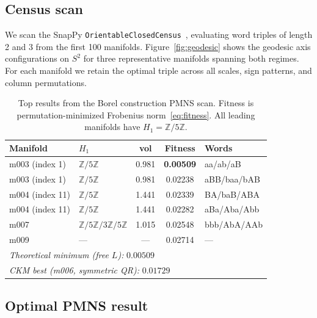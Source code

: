 \documentclass[11pt,a4paper]{article}
\newcommand{\Zfive}{\mathbb{Z}/5\mathbb{Z}}
\begin{document}
\subsection{Census scan}

We scan the SnapPy \texttt{OrientableClosedCensus}~\cite{snappy},
evaluating word triples of length 2 and 3 from the first 100 manifolds. 
Figure~\ref{fig:geodesic} shows the geodesic axis configurations on $S^2$ for three representative manifolds spanning both regimes.
For each manifold we retain the optimal triple across all scales,
sign patterns, and column permutations.

\begin{table}[!t]
\centering
\caption{Top results from the Borel construction PMNS scan.
Fitness is permutation-minimized Frobenius norm~\eqref{eq:fitness}.
All leading manifolds have $H_1 = \Zfive$.}
\label{tab:pmns_results}
\begin{tabular}{llccl}
\toprule
Manifold & $H_1$ & vol & Fitness & Words \\
\midrule
m003 (index 1) & $\Zfive$        & 0.981 & \textbf{0.00509} & aa/ab/aB \\
m003 (index 1) & $\Zfive$        & 0.981 & 0.02238          & aBB/baa/bAB \\
m004 (index 11)& $\Zfive$        & 1.441 & 0.02339          & BA/baB/ABA \\
m004 (index 11)& $\Zfive$        & 1.441 & 0.02282          & aBa/Aba/Abb \\
m007           & $\Zfive/3\Zfive$& 1.015 & 0.02548          & bbb/AbA/AAb \\
m009           & ---             & ---   & 0.02714          & --- \\
\midrule
\multicolumn{5}{l}{\textit{Theoretical minimum (free $L$):} \quad $0.00509$} \\
\multicolumn{5}{l}{\textit{CKM best (m006, symmetric QR):} \quad $0.01729$} \\
\bottomrule
\end{tabular}
\end{table}

\subsection{Optimal PMNS result}
\end{document}
